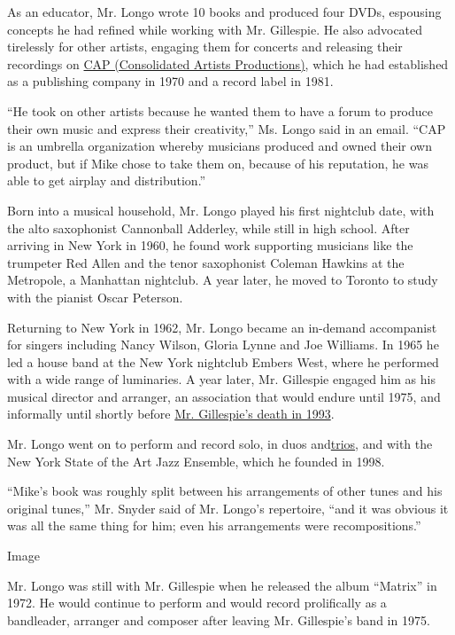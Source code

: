 As an educator, Mr. Longo wrote 10 books and produced four DVDs,
espousing concepts he had refined while working with Mr. Gillespie. He
also advocated tirelessly for other artists, engaging them for concerts
and releasing their recordings on
\href{https://jazztimes.com/archives/label-watch-consolidated-artists/}{CAP
(Consolidated Artists Productions)}, which he had established as a
publishing company in 1970 and a record label in 1981.

``He took on other artists because he wanted them to have a forum to
produce their own music and express their creativity,'' Ms. Longo said
in an email. ``CAP is an umbrella organization whereby musicians
produced and owned their own product, but if Mike chose to take them on,
because of his reputation, he was able to get airplay and
distribution.''

Born into a musical household, Mr. Longo played his first nightclub
date, with the alto saxophonist Cannonball Adderley, while still in high
school. After arriving in New York in 1960, he found work supporting
musicians like the trumpeter Red Allen and the tenor saxophonist Coleman
Hawkins at the Metropole, a Manhattan nightclub. A year later, he moved
to Toronto to study with the pianist Oscar Peterson.

Returning to New York in 1962, Mr. Longo became an in-demand accompanist
for singers including Nancy Wilson, Gloria Lynne and Joe Williams. In
1965 he led a house band at the New York nightclub Embers West, where he
performed with a wide range of luminaries. A year later, Mr. Gillespie
engaged him as his musical director and arranger, an association that
would endure until 1975, and informally until shortly before
\href{https://www.nytimes3xbfgragh.onion/1993/01/07/arts/dizzy-gillespie-who-sounded-some-of-modern-jazz-s-earliest-notes-dies-at-75.html}{Mr.
Gillespie's death in 1993}.

Mr. Longo went on to perform and record solo, in duos
and\href{https://www.youtube.com/watch?v=8bgr-fDptYQ}{trios}, and with
the New York State of the Art Jazz Ensemble, which he founded in 1998.

``Mike's book was roughly split between his arrangements of other tunes
and his original tunes,'' Mr. Snyder said of Mr. Longo's repertoire,
``and it was obvious it was all the same thing for him; even his
arrangements were recompositions.''

Image

Mr. Longo was still with Mr. Gillespie when he released the album
``Matrix'' in 1972. He would continue to perform and would record
prolifically as a bandleader, arranger and composer after leaving Mr.
Gillespie's band in 1975.

